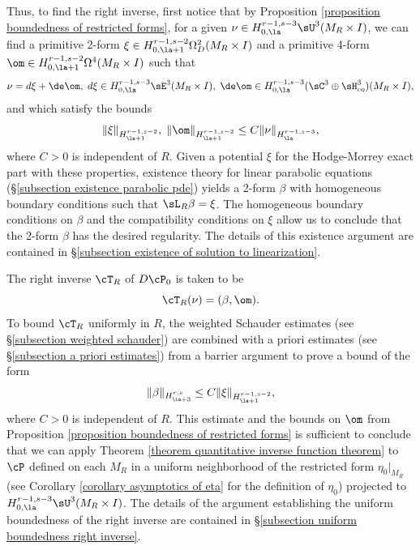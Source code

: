 \documentclass[hidelinks, 12pt, oneside, reqno]{amsart}
\begin{document}
Thus, to find the right inverse, first notice that by Proposition \ref{proposition boundedness of restricted forms}, for a given $\nu \in H_{0,\la}^{r-1,s-3}\sU^3(M_R \times I)$, we can find a primitive 2-form $\xi \in H_{0,\la+1}^{r-1,s-2}\Omega_D^2(M_R \times I)$ and a primitive 4-form $\om \in H_{0,\la+1}^{r-1,s-2}\Omega^4(M_R \times I)$ such that 
\[
\nu = d\xi + \de \om, \; d\xi \in H_{0,\la}^{r-1,s-3}\sE^3(M_R \times I), \;  \de \om \in H_{0,\la}^{r-1,s-3}(\sC^3 \oplus \sH^3_{co})(M_R \times I),
\]
and which satisfy the bounds
\[
\|\xi\|_{H^{r-1,s-2}_{\la+1}}, \; \|\om\|_{H^{r-1,s-2}_{\la+1}} \le C \|\nu\|_{H^{r-1,s-3}_{\la}},
\]
where $C > 0$ is independent of $R$. Given a potential $\xi$ for the Hodge-Morrey exact part with these properties, existence theory for linear parabolic equations (\S \ref{subsection existence parabolic pde}) yields a 2-form $\beta$ with homogeneous boundary conditions such that $\sL_R \beta = \xi$. The homogeneous boundary conditions on $\beta$ and the compatibility conditions on $\xi$ allow us to conclude that the 2-form $\beta$ has the desired regularity. The details of this existence argument are contained in \S \ref{subsection existence of solution to linearization}.

The right inverse $\cT_R$ of $D\cP_0$ is taken to be
\[
\cT_R(\nu) = (\beta, \om).
\]
To bound $\cT_R$ uniformly in $R$, the weighted Schauder estimates (see \S \ref{subsection weighted schauder}) are combined with a priori estimates (see \S \ref{subsection a priori estimates}) from a barrier argument to prove a bound of the form 
\[
\|\beta\|_{H^{r,s}_{\la+3}} \le C \|\xi\|_{H^{r-1,s-2}_{\la+1}},
\]
where $C>0$ is independent of $R$. This estimate and the bounds on $\om$ from Proposition \ref{proposition boundedness of restricted forms} is sufficient to conclude that we can apply Theorem \ref{theorem quantitative inverse function theorem} to $\cP$ defined on each $M_R$ in a uniform neighborhood of the restricted form $\eta_0|_{M_R}$ (see Corollary \ref{corollary asymptotics of eta} for the definition of $\eta_0$) projected to $H^{r-1, s-3}_{0,\la}\sU^3 (M_R \times I)$. The details of the argument establishing the uniform boundedness of the right inverse are contained in \S \ref{subsection uniform boundedness right inverse}. 
\end{document}
